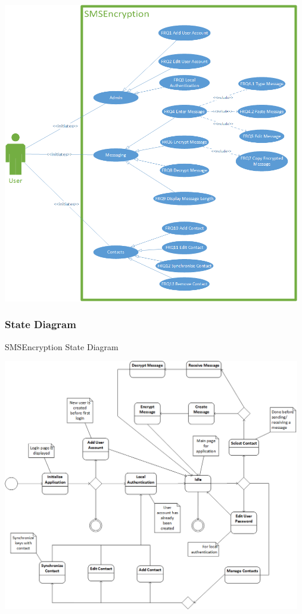 \begin{center}
 \includegraphics[width=13cm]{diagrams/UseCaseDiagrams/UsecaseV5.png}
\end{center}
\newpage
\subsubsection{State Diagram}
SMSEncryption State Diagram

\begin{center}
 \includegraphics[width=13cm]{diagrams/StateDiagrams/SMSEncryptionStateMachine.png}
\end{center}


